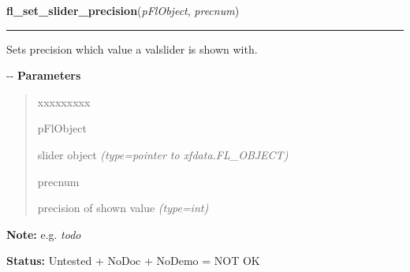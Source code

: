 \hspace{.8\funcindent}\begin{boxedminipage}{\funcwidth}

    \raggedright \textbf{fl\_set\_slider\_precision}(\textit{pFlObject}, \textit{precnum})

    \vspace{-1.5ex}

    \rule{\textwidth}{0.5\fboxrule}
\setlength{\parskip}{2ex}

Sets precision which value a valslider is shown with.

-{}-
\setlength{\parskip}{1ex}
      \textbf{Parameters}
      \vspace{-1ex}

      \begin{quote}
        \begin{Ventry}{xxxxxxxxx}

          \item[pFlObject]


slider object
            {\it (type=pointer to xfdata.FL\_OBJECT)}

          \item[precnum]


precision of shown value
            {\it (type=int)}

        \end{Ventry}

      \end{quote}

\textbf{Note:} 
e.g. \emph{todo}


\textbf{Status:} 
Untested + NoDoc + NoDemo = NOT OK


    \end{boxedminipage}

    \label{xformslib:flslider:fl_set_slider_filter}

    \vspace{0.5ex}

